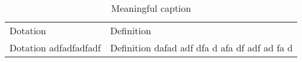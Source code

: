 \documentclass{mcmthesis}
\begin{document}
	
\begin{table}[htbp]
	
	\everyrow{\hline}
	\tabulinesep=1.2mm
	
	\begin{tabu}to\textwidth {|X[c]|X[1.5, l]|}
		\rowfont[c] {} Dotation &  Definition\\
		Dotation adfadfadfadf & Definition dafad adf dfa d afa df adf ad fa d\\
	\end{tabu}
	
	\caption{Meaningful caption}
	\label{T:my_table}
	
\end{table}
	
\end{document}
